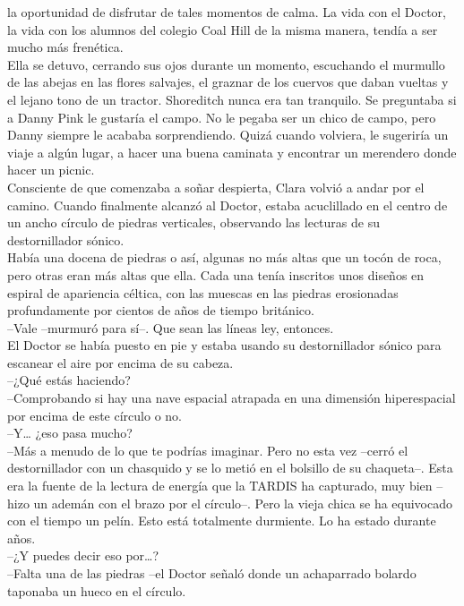 {la oportunidad de disfrutar de tales momentos de calma. La vida con el
Doctor, la vida con los alumnos del colegio Coal Hill de la misma
manera, tendía a ser mucho más frenética.\\
Ella se detuvo, cerrando sus ojos durante un momento, escuchando el
murmullo de las abejas en las flores salvajes, el graznar de los cuervos
que daban vueltas y el lejano tono de un tractor. Shoreditch nunca era
tan tranquilo. Se preguntaba si a Danny Pink le gustaría el campo. No le
pegaba ser un chico de campo, pero Danny siempre le acababa
sorprendiendo. Quizá cuando volviera, le sugeriría un viaje a algún
lugar, a hacer una buena caminata y encontrar un merendero donde hacer
un picnic.\\
Consciente de que comenzaba a soñar despierta, Clara volvió a andar por
el camino. Cuando finalmente alcanzó al Doctor, estaba acuclillado en el
centro de un ancho círculo de piedras verticales, observando las
lecturas de su destornillador sónico.\\
Había una docena de piedras o así, algunas no más altas que un tocón de
roca, pero otras eran más altas que ella. Cada una tenía inscritos unos
diseños en espiral de apariencia céltica, con las muescas en las piedras
erosionadas profundamente por cientos de años de tiempo británico.\\
--Vale --murmuró para sí--. Que sean las líneas ley, entonces.\\
El Doctor se había puesto en pie y estaba usando su destornillador
sónico para escanear el aire por encima de su cabeza.\\
--¿Qué estás haciendo?\\
--Comprobando si hay una nave espacial atrapada en una dimensión
hiperespacial por encima de este círculo o no.\\
--Y\ldots{} ¿eso pasa mucho?\\
--Más a menudo de lo que te podrías imaginar. Pero no esta vez --cerró
el destornillador con un chasquido y se lo metió en el bolsillo de su
chaqueta--. Esta era la fuente de la lectura de energía que la TARDIS ha
capturado, muy bien --hizo un ademán con el brazo por el círculo--. Pero
la vieja chica se ha equivocado con el tiempo un pelín. Esto está
totalmente durmiente. Lo ha estado durante años.\\
--¿Y puedes decir eso por\ldots{}?\\
--Falta una de las piedras --el Doctor señaló donde un achaparrado
bolardo taponaba un hueco en el círculo.\\
}
